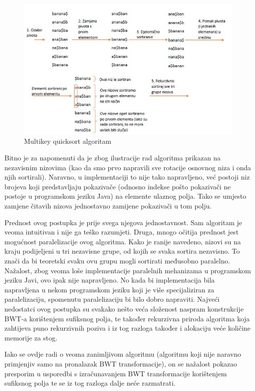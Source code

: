 \begin{figure}[h]
   \centering
       \includegraphics[width=\textwidth]{./pictures/MKQS.jpg}
 \caption{Multikey quicksort algoritam}
 \label{fig:mkqs}
\end{figure}

Bitno je za napomenuti da je zbog ilustracije rad algoritma prikazan na nezavisnim nizovima (kao da smo prvo napravili sve rotacije osnovnog niza i onda njih sortirali). Naravno, u implementaciji to nije tako napravljeno, već postoji niz brojeva koji predstavljaju pokazivače (odnosno indekse pošto pokazivači ne postoje u programskom jeziku Java) na elemente ulaznog polja. Tako se umjesto zamjene čitavih nizova jednostavno zamijene pokazivači u tom polju.

Prednost ovog postupka je prije svega njegova jednostavnost. Sam algoritam je veoma intuitivan i nije ga teško razumjeti. Druga, mnogo očitija prednost jest mogućnost paralelizacije ovog algoritma. Kako je ranije navedeno, nizovi su na kraju podijeljeni u tri nezavisne grupe, od kojih se svaka sortira nezavisno. To znači da bi teoretski svaku ovu grupu mogli sortirati međusobno paralelno. Nažalost, zbog veoma loše implementacije paralelnih mehanizama u programskom jeziku Javi, ovo ipak nije napravljeno. No kada bi implementacija bila napravljena u nekom programskom jeziku koji je više specijaliziran za paralelizaciju, spomenutu paralelizaciju bi bilo dobro napraviti. Najveći nedostatci ovog postupka su svakako nešto veća složenost naspram konstrukcije BWT-a korištenjem sufiksnog polja, te također rekurzivna priroda algoritma koja zahtijeva puno rekurzivnih poziva i iz tog razloga također i alokaciju veće količine memorije za stog.

Iako se ovdje radi o veoma zanimljivom algoritmu (algoritmu koji nije naravno primjenjiv samo na pronalazak BWT transformacije), on se nažalost pokazao presporim u usporedbi s izračunavanjem BWT transformacije korištenjem sufiksnog polja te se iz tog razloga dalje neće razmatrati.

